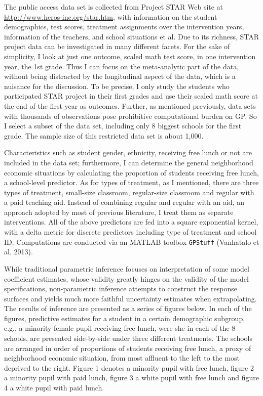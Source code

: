 The public access data set is collected from Project STAR Web site at
\url{http://www.heros-inc.org/star.htm}, with information on the student
demographics, test scores, treatment assignments over the intervention
years, information of the teachers, and school situations et al. Due to
its richness, STAR project data can be investigated in many different
facets. For the sake of simplicity, I look at just one outcome, scaled
math test score, in one intervention year, the 1st grade. Thus I can
focus on the meta-analytic part of the data, without being distracted by
the longitudinal aspect of the data, which is a nuisance for the
discussion. To be precise, I only study the students who participated
STAR project in their first grades and use their scaled math score at
the end of the first year as outcomes. Further, as mentioned previously,
data sets with thousands of observations pose prohibitive computational
burden on GP. So I select a subset of the data set, including only 8
biggest schools for the first grade. The sample size of this restricted
data set is about 1,000.

Characteristics such as student gender, ethnicity, receiving free lunch
or not are included in the data set; furthermore, I can determine the
general neighborhood economic situations by calculating the proportion
of students receiving free lunch, a school-level predictor. As for types
of treatment, as I mentioned, there are three types of treatment,
small-size classroom, regular-size classroom and regular with a paid
teaching aid. Instead of combining regular and regular with an aid, an
approach adopted by most of previous literature, I treat them as
separate interventions. All of the above predictors are fed into a
square exponential kernel, with a delta metric for discrete predictors
including type of treatment and school ID. Computations are conducted
via an MATLAB toolbox \texttt{GPStuff} (Vanhatalo et al. 2013).

While traditional parametric inference focuses on interpretation of some
model coefficient estimates, whose validity greatly hinges on the
validity of the model specifications, non-parametric inference attempts
to construct the response surfaces and yields much more faithful
uncertainty estimates when extrapolating. The results of inference are
presented as a series of figures below. In each of the figures,
predictive estimates for a student in a certain demographic subgroup,
e.g., a minority female pupil receiving free lunch, were she in each of
the 8 schools, are presented side-by-side under three different
treatments. The schools are arranged in order of proportions of students
receiving free lunch, a proxy of neighborhood economic situation, from
most affluent to the left to the most deprived to the right. Figure 1
denotes a minority pupil with free lunch, figure 2 a minority pupil with
paid lunch, figure 3 a white pupil with free lunch and figure 4 a white
pupil with paid lunch.

